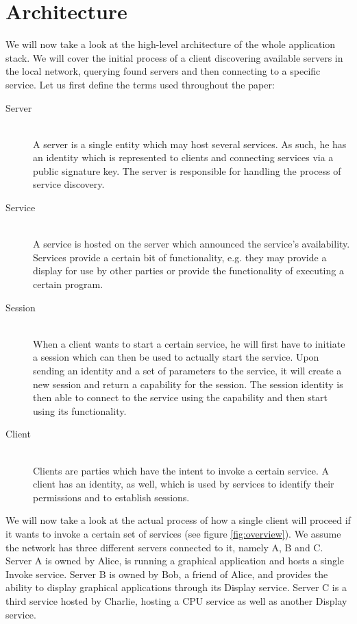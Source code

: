 \section{Architecture}
\label{sec:architecture}

We will now take a look at the high-level architecture of the whole application stack.
We will cover the initial process of a client discovering available servers in the local network, querying found servers and then connecting to a specific service.
Let us first define the terms used throughout the paper:
\begin{description}
    \item[Server]\hfill\\
        A server is a single entity which may host several services.
        As such, he has an identity which is represented to clients and connecting services via a public signature key.
        The server is responsible for handling the process of service discovery.
    \item[Service]\hfill\\
        A service is hosted on the server which announced the service's availability.
        Services provide a certain bit of functionality, e.g. they may provide a display for use by other parties or provide the functionality of executing a certain program.
    \item[Session]\hfill\\
        When a client wants to start a certain service, he will first have to initiate a session which can then be used to actually start the service.
        Upon sending an identity and a set of parameters to the service, it will create a new session and return a capability for the session.
        The session identity is then able to connect to the service using the capability and then start using its functionality.
    \item[Client]\hfill\\
        Clients are parties which have the intent to invoke a certain service.
        A client has an identity, as well, which is used by services to identify their permissions and to establish sessions.
\end{description}

We will now take a look at the actual process of how a single client will proceed if it wants to invoke a certain set of services (see figure \ref{fig:overview}).
We assume the network has three different servers connected to it, namely A, B and C.
Server A is owned by Alice, is running a graphical application and hosts a single Invoke service.
Server B is owned by Bob, a friend of Alice, and provides the ability to display graphical applications through its Display service.
Server C is a third service hosted by Charlie, hosting a CPU service as well as another Display service.

